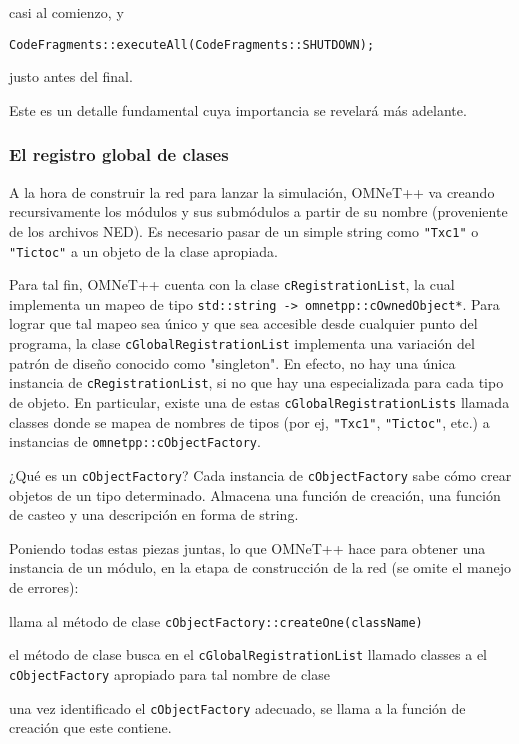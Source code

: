 \documentclass[]{article}
\begin{document}
casi al comienzo, y

\begin{verbatim}
CodeFragments::executeAll(CodeFragments::SHUTDOWN);
\end{verbatim}

justo antes del final.

Este es un detalle fundamental cuya importancia se revelará más adelante.


\subsubsection{El registro global de clases}

A la hora de construir la red para lanzar la simulación, OMNeT++ va creando
recursivamente los módulos y sus submódulos a partir de su nombre (proveniente
de los archivos NED). Es necesario pasar de un simple string como \verb!"Txc1"!
o \verb!"Tictoc"! a un objeto de la clase apropiada.

Para tal fin, OMNeT++ cuenta con la clase \verb!cRegistrationList!, la cual
implementa un mapeo de tipo \verb!std::string -> omnetpp::cOwnedObject*!. Para
lograr que tal mapeo sea único y que sea accesible desde cualquier punto del
programa, la clase \verb!cGlobalRegistrationList! implementa una variación del
patrón de diseño conocido como "singleton". En efecto, no hay una única
instancia de \verb!cRegistrationList!, si no que hay una especializada para
cada tipo de objeto. En particular, existe una de estas
\verb!cGlobalRegistrationLists! llamada classes donde se mapea de nombres de
tipos (por ej, \verb!"Txc1"!, \verb!"Tictoc"!, etc.) a instancias de
\verb!omnetpp::cObjectFactory!.

¿Qué es un \verb!cObjectFactory!? Cada instancia de \verb!cObjectFactory! sabe
cómo crear objetos de un tipo determinado. Almacena una función de creación,
una función de casteo y una descripción en forma de string.

Poniendo todas estas piezas juntas, lo que OMNeT++ hace para obtener una
instancia de un módulo, en la etapa de construcción de la red (se omite el
manejo de errores):

llama al método de clase \verb!cObjectFactory::createOne(className)!

el método de clase busca en el \verb!cGlobalRegistrationList! llamado classes a el
\verb!cObjectFactory! apropiado para tal nombre de clase

una vez identificado el \verb!cObjectFactory! adecuado, se llama a la función de
creación que este contiene.
\end{document}
